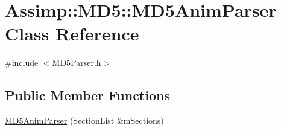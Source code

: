 \hypertarget{class_assimp_1_1_m_d5_1_1_m_d5_anim_parser}{\section{Assimp\+:\+:M\+D5\+:\+:M\+D5\+Anim\+Parser Class Reference}
\label{class_assimp_1_1_m_d5_1_1_m_d5_anim_parser}
}


{\ttfamily \#include $<$M\+D5\+Parser.\+h$>$}

\subsection*{Public Member Functions}
\begin{DoxyCompactItemize}
\item 
\hyperlink{class_assimp_1_1_m_d5_1_1_m_d5_anim_parser_ac079df556679db0bd7d4e9dba25abf06}{M\+D5\+Anim\+Parser} (Section\+List \&m\+Sections)
\end{DoxyCompactItemize}
